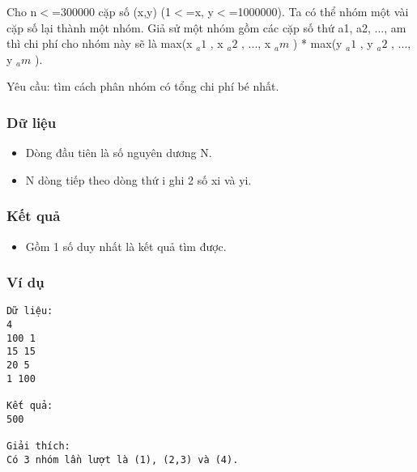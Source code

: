 



   Cho n$<$=300000 cặp số (x,y) (1$<$=x, y$<$=1000000). Ta có thể nhóm một vài cặp số lại thành một nhóm. Giả sử một nhóm gồm các cặp số thứ a1, a2, ..., am thì chi phí cho nhóm này sẽ là max(x   $_    a1   $   , x   $_    a2   $   , ..., x   $_    am   $   ) * max(y   $_    a1   $   , y   $_    a2   $   , ..., y   $_    am   $   ).  

   Yêu cầu: tìm cách phân nhóm có tổng chi phí bé nhất.  

\subsubsection{   Dữ liệu  }
\begin{itemize}
	\item     Dòng đầu tiên là số nguyên dương N.   
	\item     N dòng tiếp theo dòng thứ i ghi 2 số xi và yi.   
\end{itemize}

\subsubsection{   Kết quả  }
\begin{itemize}
	\item     Gồm 1 số duy nhất là kết quả tìm được.   
\end{itemize}

\subsubsection{   Ví dụ  }
\begin{verbatim}
Dữ liệu:
4
100 1
15 15
20 5
1 100

Kết quả:
500

Giải thích: 
Có 3 nhóm lần lượt là (1), (2,3) và (4). 

\end{verbatim}